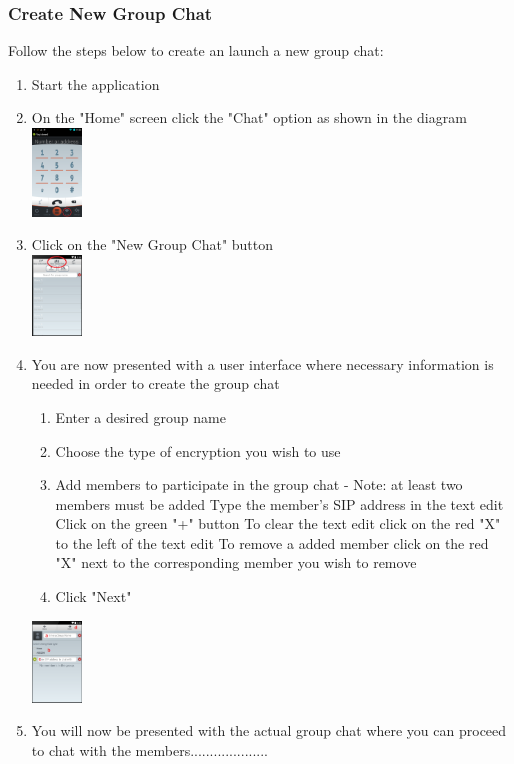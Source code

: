 \documentclass[11pt]{article}
\begin{document}
\subsubsection*{Create New Group Chat}
Follow the steps below to create an launch a new group chat:
\begin{enumerate}
\item Start the application
\item On the "Home" screen click the "Chat" option as shown in the diagram\\
\includegraphics[width=50px]{images/mainScreen.png}
\item Click on the "New Group Chat" button\\
\includegraphics[width=50px]{images/ChatlistCG.png}
\item You are now presented with a user interface where necessary information is needed in order to create the group chat
\begin{enumerate}
\item Enter a desired group name
\item Choose the type of encryption you wish to use
\item Add members to participate in the group chat - Note: at least two members must be added
\subitem Type the member's SIP address in the text edit
\subitem Click on the green "+" button
\subitem To clear the text edit click on the red "X" to the left of the text edit
\subitem To remove a added member click on the red "X" next to the corresponding member you wish to remove
\item Click "Next"
\end{enumerate}
\includegraphics[width=50px]{images/GroupChatCreation.png}
\item You will now be presented with the actual group chat where you can proceed to chat with the members....................\\

\end{enumerate}
\end{document}
